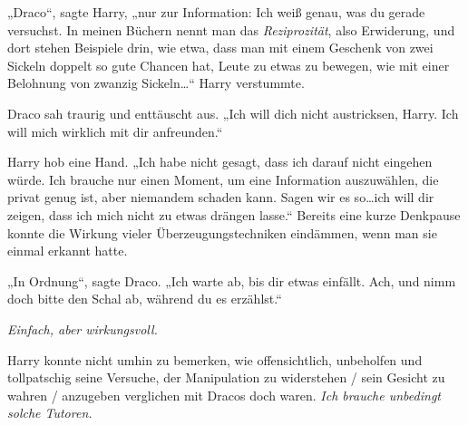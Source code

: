 „Draco“, sagte Harry, „nur zur Information: Ich weiß genau, was du gerade versuchst. In meinen Büchern nennt man das \emph{Reziprozität}, also Erwiderung, und dort stehen Beispiele drin, wie etwa, dass man mit einem Geschenk von zwei Sickeln doppelt so gute Chancen hat, Leute zu etwas zu bewegen, wie mit einer Belohnung von zwanzig Sickeln…“ Harry verstummte.

Draco sah traurig und enttäuscht aus. „Ich will dich nicht austricksen, Harry. Ich will mich wirklich mit dir anfreunden.“

Harry hob eine Hand. „Ich habe nicht gesagt, dass ich darauf nicht eingehen würde. Ich brauche nur einen Moment, um eine Information auszuwählen, die privat genug ist, aber niemandem schaden kann. Sagen wir es so…ich will dir zeigen, dass ich mich nicht zu etwas drängen lasse.“ Bereits eine kurze Denkpause konnte die Wirkung vieler Überzeugungstechniken eindämmen, wenn man sie einmal erkannt hatte.

„In Ordnung“, sagte Draco. „Ich warte ab, bis dir etwas einfällt. Ach, und nimm doch bitte den Schal ab, während du es erzählst.“

\emph{Einfach, aber wirkungsvoll.}

Harry konnte nicht umhin zu bemerken, wie offensichtlich, unbeholfen und tollpatschig seine Versuche, der Manipulation zu widerstehen / sein Gesicht zu wahren / anzugeben verglichen mit Dracos doch waren. \emph{Ich brauche unbedingt solche Tutoren.}

